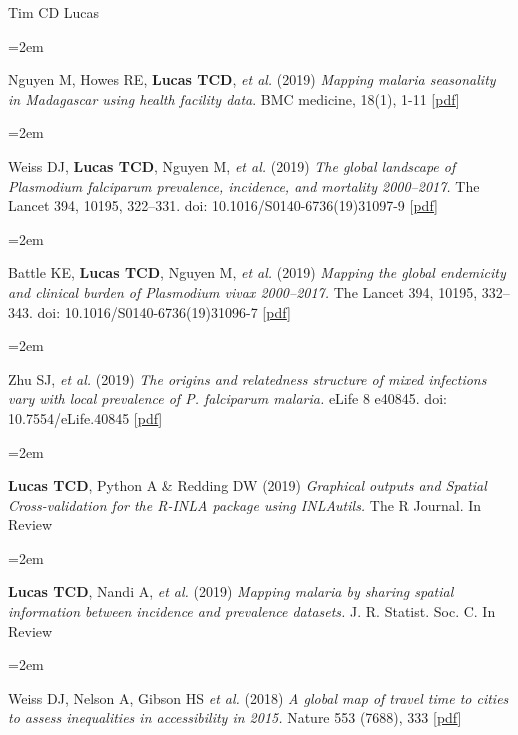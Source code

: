 \documentclass{scrartcl}
\newcommand{\MarginText}[1]{\marginpar{\raggedleft\itshape\small#1}} %
\newcommand{\Description}[1]{\hangindent=2em\hangafter=0\noindent\raggedright\footnotesize{#1}\par\normalsize\vspace{1em}} %
\begin{document}
\begin{cv}{Tim {\Large CD} Lucas}

\vspace{2em} %

{\color{Maroon}}\vspace{1em}


\Description{\MarginText{2020}Nguyen M, Howes RE, \textbf{Lucas TCD},  \emph{et al.} (2019) \emph{Mapping malaria seasonality in Madagascar using health facility data}. BMC medicine, 18(1), 1-11 [\href{https://bmcmedicine.biomedcentral.com/track/pdf/10.1186/s12916-019-1486-3}{pdf}]}


\Description{\MarginText{2019}Weiss DJ, \textbf{Lucas TCD}, Nguyen M, \emph{et al.} (2019) \emph{The global landscape of \emph{Plasmodium falciparum} prevalence, incidence, and mortality 2000--2017.} The Lancet 394, 10195, 322--331. doi: 10.1016/S0140-6736(19)31097-9 [\href{https://doi.org/10.1016/S0140-6736(19)31097-9}{pdf}]}

\Description{Battle KE, \textbf{Lucas TCD},  Nguyen M, \emph{et al.} (2019) \emph{Mapping the global endemicity and clinical burden of \emph{Plasmodium vivax} 2000--2017.} The Lancet 394, 10195, 332--343. doi: 10.1016/S0140-6736(19)31096-7 [\href{https://doi.org/10.1016/S0140-6736(19)31096-7}{pdf}]}

\Description{Zhu SJ, \emph{et al.} (2019) \emph{The origins and relatedness structure of mixed infections vary with local prevalence of \emph{P. falciparum} malaria.} eLife 8 e40845. doi: 10.7554/eLife.40845 [\href{https://doi.org/10.7554/eLife.40845}{pdf}]}


\Description{\textbf{Lucas TCD}, Python A \& Redding DW (2019) \emph{Graphical outputs and Spatial Cross-validation for the R-INLA package using INLAutils.} The R Journal. In Review}

\Description{\textbf{Lucas TCD}, Nandi A, \emph{et al.} (2019) \emph{Mapping malaria by sharing spatial information between incidence and prevalence datasets.} J. R. Statist. Soc. C. In Review}



\Description{\MarginText{2018}Weiss DJ, Nelson A, Gibson HS \emph{et al.} (2018) \emph{A global map of travel time to cities to assess inequalities in accessibility in 2015.} Nature 553 (7688), 333 [\href{https://www.nature.com/articles/nature25181.pdf}{pdf}]}


\end{cv}
\end{document}
